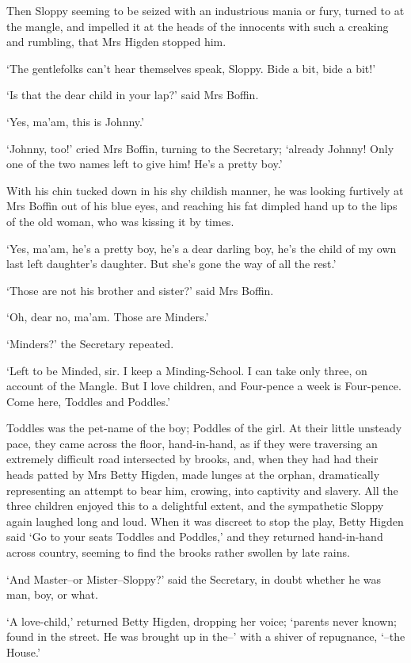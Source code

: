 Then Sloppy seeming to be seized with an industrious mania or fury,
turned to at the mangle, and impelled it at the heads of the innocents
with such a creaking and rumbling, that Mrs Higden stopped him.

‘The gentlefolks can’t hear themselves speak, Sloppy. Bide a bit, bide a
bit!’

‘Is that the dear child in your lap?’ said Mrs Boffin.

‘Yes, ma’am, this is Johnny.’

‘Johnny, too!’ cried Mrs Boffin, turning to the Secretary; ‘already
Johnny! Only one of the two names left to give him! He’s a pretty boy.’

With his chin tucked down in his shy childish manner, he was looking
furtively at Mrs Boffin out of his blue eyes, and reaching his fat
dimpled hand up to the lips of the old woman, who was kissing it by
times.

‘Yes, ma’am, he’s a pretty boy, he’s a dear darling boy, he’s the child
of my own last left daughter’s daughter. But she’s gone the way of all
the rest.’

‘Those are not his brother and sister?’ said Mrs Boffin.

‘Oh, dear no, ma’am. Those are Minders.’

‘Minders?’ the Secretary repeated.

‘Left to be Minded, sir. I keep a Minding-School. I can take only three,
on account of the Mangle. But I love children, and Four-pence a week is
Four-pence. Come here, Toddles and Poddles.’

Toddles was the pet-name of the boy; Poddles of the girl. At their
little unsteady pace, they came across the floor, hand-in-hand, as if
they were traversing an extremely difficult road intersected by brooks,
and, when they had had their heads patted by Mrs Betty Higden, made
lunges at the orphan, dramatically representing an attempt to bear him,
crowing, into captivity and slavery. All the three children enjoyed this
to a delightful extent, and the sympathetic Sloppy again laughed long
and loud. When it was discreet to stop the play, Betty Higden said
‘Go to your seats Toddles and Poddles,’ and they returned hand-in-hand
across country, seeming to find the brooks rather swollen by late rains.

‘And Master--or Mister--Sloppy?’ said the Secretary, in doubt whether he
was man, boy, or what.

‘A love-child,’ returned Betty Higden, dropping her voice; ‘parents
never known; found in the street. He was brought up in the--’ with a
shiver of repugnance, ‘--the House.’

